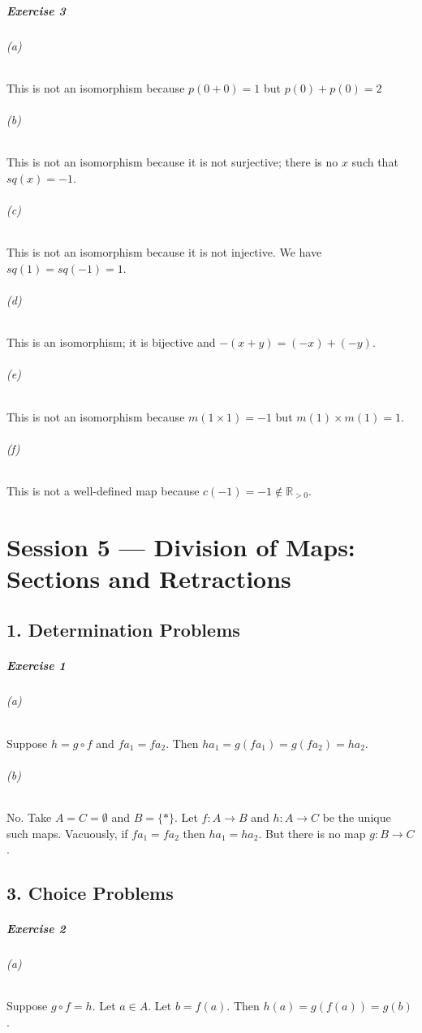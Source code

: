 \documentclass{report}
\begin{document}
    \paragraph{Exercise 3}
    \subparagraph{(a)}
    This is not an isomorphism because $p(0 + 0) = 1$ but $p(0) + p(0) = 2$

    \subparagraph{(b)}
    This is not an isomorphism because it is not surjective; there is no $x$ such that $sq(x) = -1$.

    \subparagraph{(c)}
    This is not an isomorphism because it is not injective. We have $sq(1) = sq(-1) = 1$.

    \subparagraph{(d)}
    This is an isomorphism; it is bijective and $-(x+y) = (-x) + (-y)$.

    \subparagraph{(e)}
    This is not an isomorphism because $m(1 \times 1) = -1$ but $m(1) \times m(1) = 1$.

    \subparagraph{(f)}
    This is not a well-defined map because $c(-1) = -1 \notin \mathbb{R}_{>0}$.

    \chapter{Session 5 --- Division of Maps: Sections and Retractions}

    \section{1. Determination Problems}

    \paragraph{Exercise 1}
    \subparagraph{(a)}
    Suppose $h = g \circ f$ and $f a_1 = f a_2$. Then $h a_1 = g(f a_1) = g(f a_2) = h a_2$.

    \subparagraph{(b)}
    No. Take $A = C = \emptyset$ and $B = \{ * \}$. Let $f : A \rightarrow B$ and $h : A \rightarrow C$
    be the unique such maps. Vacuously, if $f a_1 = f a_2$ then $h a_1 = h a_2$. But there is no map
    $g : B \rightarrow C$.

    \section{3. Choice Problems}

    \paragraph{Exercise 2}
    \subparagraph{(a)}
    Suppose $g \circ f = h$. Let $a \in A$. Let $b = f(a)$. Then $h(a) = g(f(a)) = g(b)$.
\end{document}
